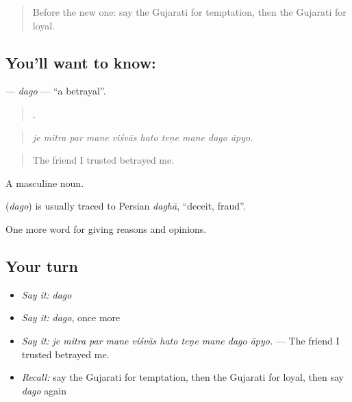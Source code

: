 \label{lesson:GU-C360-dago}



\begin{quote}
Before the new one: say the Gujarati for temptation, then the Gujarati for loyal.
\end{quote}

\subsection*{You'll want to know: }
\textbf{} — \emph{dago} — \textquotedblleft{}a betrayal\textquotedblright{}.

\begin{quote}
         .
\end{quote}

\begin{quote}
\emph{je mitra par mane viśvās hato teṇe mane dago āpyo.}
\end{quote}

\begin{quote}
The friend I trusted betrayed me.
\end{quote}

A masculine noun.

\begin{cousinweb}
\textbf{} (\emph{dago}) is usually traced to Persian \emph{daghā}, \textquotedblleft{}deceit, fraud\textquotedblright{}.
\end{cousinweb}

\begin{grammarlens}[title={What you've built}]
One more word for giving reasons and opinions.
\end{grammarlens}

\subsection*{Your turn}
\begin{itemize}
\raggedright
  \item \emph{Say it:} \emph{dago}
  \item \emph{Say it:} \emph{dago}, once more
  \item \emph{Say it:} \emph{je mitra par mane viśvās hato teṇe mane dago āpyo.} — The friend I trusted betrayed me.
  \item \emph{Recall:} say the Gujarati for temptation, then the Gujarati for loyal, then say \emph{dago} again
\end{itemize}

